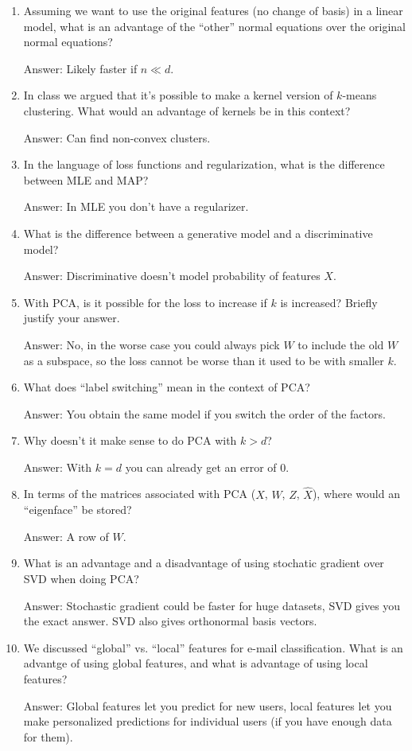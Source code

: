 \documentclass{article}
\def\ans#1{\par\gre{Answer: #1}}
\def\blu#1{{\color{blu}#1}}
\def\gre#1{{\color{gre}#1}}
\def\enum#1{\begin{enumerate}#1\end{enumerate}}
\begin{document}
\blu{
\enum{
\item Assuming we want to use the original features (no change of basis) in a linear model, what is an advantage of the ``other'' normal equations over the original normal equations?
\ans{Likely faster if $n \ll d$.}
\item In class we argued that it's possible to make a kernel version of $k$-means clustering. What would an advantage of kernels be in this context?
\ans{Can find non-convex clusters.}
\item In the language of loss functions and regularization, what is the difference between MLE and MAP?
\ans{In MLE you don't have a regularizer.}
\item What is the difference between a generative model and a discriminative model?
\ans{Discriminative doesn't model probability of features $X$.}
\item With PCA, is it possible for the loss to increase if $k$ is increased? Briefly justify your answer.
\ans{No, in the worse case you could always pick $W$ to include the old $W$ as a subspace, so the loss cannot be worse than it used to be with smaller $k$.}
\item What does ``label switching'' mean in the context of PCA?
\ans{You obtain the same model if you switch the order of the factors.}
\item Why doesn't it make sense to do PCA with $k > d$?
\ans{With $k=d$ you can already get an error of 0.}
\item In terms of the matrices associated with PCA ($X$, $W$, $Z$, $\hat{X}$), where would an ``eigenface'' be stored?
\ans{A row of $W$.}
\item What is an advantage and a disadvantage of using stochatic gradient over SVD when doing PCA?
\ans{Stochastic gradient could be faster for huge datasets, SVD gives you the exact answer. SVD also gives orthonormal basis vectors.}
\item We discussed ``global'' vs. ``local'' features for e-mail classification. What is an advantge of using global features, and what is advantage of using local features?
\ans{Global features let you predict for new users, local features let you make personalized predictions for individual users (if you have enough data for them).}
}
}
\end{document}
